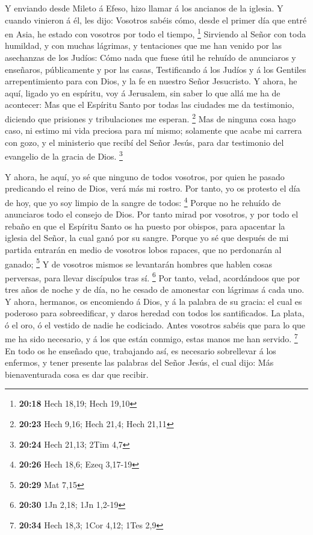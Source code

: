  Y enviando desde Mileto á Efeso, hizo llamar á los
ancianos de la iglesia.  Y cuando vinieron á él, les dijo:
Vosotros sabéis cómo, desde el primer día que entré en Asia, he estado
con vosotros por todo el tiempo, \footnote{\textbf{20:18} Hech 18,19;
  Hech 19,10}  Sirviendo al Señor con toda humildad, y con
muchas lágrimas, y tentaciones que me han venido por las asechanzas de
los Judíos:  Cómo nada que fuese útil he rehuído de
anunciaros y enseñaros, públicamente y por las casas, 
Testificando á los Judíos y á los Gentiles arrepentimiento para con
Dios, y la fe en nuestro Señor Jesucristo.  Y ahora, he
aquí, ligado yo en espíritu, voy á Jerusalem, sin saber lo que allá me
ha de acontecer:  Mas que el Espíritu Santo por todas las
ciudades me da testimonio, diciendo que prisiones y tribulaciones me
esperan. \footnote{\textbf{20:23} Hech 9,16; Hech 21,4; Hech 21,11}
 Mas de ninguna cosa hago caso, ni estimo mi vida preciosa
para mí mismo; solamente que acabe mi carrera con gozo, y el ministerio
que recibí del Señor Jesús, para dar testimonio del evangelio de la
gracia de Dios. \footnote{\textbf{20:24} Hech 21,13; 2Tim 4,7}

 Y ahora, he aquí, yo sé que ninguno de todos vosotros, por
quien he pasado predicando el reino de Dios, verá más mi rostro.
 Por tanto, yo os protesto el día de hoy, que yo soy limpio
de la sangre de todos: \footnote{\textbf{20:26} Hech 18,6; Ezeq 3,17-19}
 Porque no he rehuído de anunciaros todo el consejo de
Dios.  Por tanto mirad por vosotros, y por todo el rebaño
en que el Espíritu Santo os ha puesto por obispos, para apacentar la
iglesia del Señor, la cual ganó por su sangre.  Porque yo
sé que después de mi partida entrarán en medio de vosotros lobos
rapaces, que no perdonarán al ganado; \footnote{\textbf{20:29} Mat 7,15}
 Y de vosotros mismos se levantarán hombres que hablen
cosas perversas, para llevar discípulos tras sí. \footnote{\textbf{20:30}
  1Jn 2,18; 1Jn 1,2-19}  Por tanto, velad, acordándoos que
por tres años de noche y de día, no he cesado de amonestar con lágrimas
á cada uno.  Y ahora, hermanos, os encomiendo á Dios, y á
la palabra de su gracia: el cual es poderoso para sobreedificar, y daros
heredad con todos los santificados.  La plata, ó el oro, ó
el vestido de nadie he codiciado.  Antes vosotros sabéis
que para lo que me ha sido necesario, y á los que están conmigo, estas
manos me han servido. \footnote{\textbf{20:34} Hech 18,3; 1Cor 4,12;
  1Tes 2,9}  En todo os he enseñado que, trabajando así, es
necesario sobrellevar á los enfermos, y tener presente las palabras del
Señor Jesús, el cual dijo: Más bienaventurada cosa es dar que recibir.

